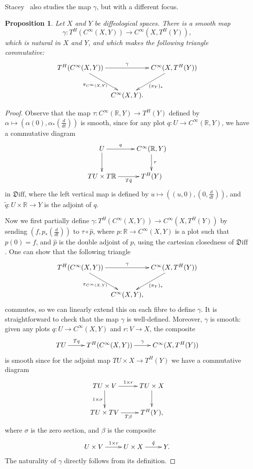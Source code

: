 \documentclass[12pt]{amsart}
\newtheorem{prop}[de]{Proposition}
\theoremstyle{remark}
\newcommand{\ra}{\to}
\newcommand{\lra}{\longrightarrow}
\newcommand{\Diff}{{\mathfrak{D}\mathrm{iff}}}
\def \R{\mathbb{R}}
\begin{document}
Stacey~\cite{St2} also studies the map $\gamma$, but with a different focus.

\begin{prop}\label{prop:map}
Let $X$ and $Y$ be diffeological spaces.
There is a smooth map
\[
\gamma:T^H(C^\infty(X,Y)) \lra C^\infty(X,T^H (Y)),
\]
which is natural in $X$ and $Y$,
and which makes the following triangle commutative:
\[
\xymatrix@C5pt{T^H(C^\infty(X,Y)) \ar[rr]^\gamma \ar[dr]_{\pi_{C^\infty(X,Y)}}
& & C^\infty(X,T^H(Y)) \ar[dl]^{(\pi_Y)_*} \\ & C^\infty(X,Y).}
\]
\end{prop}
\begin{proof}
Observe that the map $\tau:C^\infty(\R,Y) \ra T^H(Y)$ defined by
$\alpha \mapsto (\alpha(0),\alpha_* (\frac{d}{dt}))$ is smooth,
since for any plot $q:U \ra C^\infty(\R,Y)$,
we have a commutative diagram
\[
\xymatrix{U \ar[d] \ar[r]^-q & C^\infty(\R,Y) \ar[d]^-\tau \\
          TU \times T \R \ar[r]_-{T \tilde{q}} & T^H(Y)}
\]
in $\Diff$,
where the left vertical map is defined by $u \mapsto ((u,0),(0,\frac{d}{dt}))$,
and $\tilde{q}:U \times \R \ra Y$ is the adjoint of $q$.

Now we first partially define $\gamma:T^H(C^\infty(X,Y)) \ra C^\infty(X,T^H (Y))$
by sending $(f,p_*(\frac{d}{dt}))$ to $\tau \circ \hat{p}$,
where $p:\R \ra C^\infty(X,Y)$ is a plot such that $p(0)=f$,
and $\hat{p}$ is the double adjoint of $p$,
using the cartesian closedness of $\Diff$.
One can show that the following triangle
\[
\xymatrix@C5pt{T^H(C^\infty(X,Y)) \ar[rr]^\gamma \ar[dr]_{\pi_{C^\infty(X,Y)}} & & C^\infty(X,T^H(Y)) \ar[dl]^{(\pi_Y)_*} \\ & C^\infty(X,Y),}
\]
commutes, so we can linearly extend this on each fibre to define $\gamma$.
It is straightforward to check that the map $\gamma$ is well-defined.
Moreover, $\gamma$ is smooth:
given any plots $q:U \ra C^\infty(X,Y)$ and $r:V \ra X$, the composite
\[
\xymatrix{TU \ar[r]^-{Tq} & T^H(C^\infty(X,Y)) \ar[r]^\gamma & C^\infty(X,T^H(Y))}
\]
is smooth since for the adjoint map $TU \times X \ra T^H(Y)$
we have a commutative diagram
\[
\xymatrix{TU \times V \ar[r]^{1 \times r} \ar[d]_{1 \times \sigma} & TU \times X \ar[d] \\ TU \times TV \ar[r]_{T \beta} & T^H(Y),}
\]
where $\sigma$ is the zero section, and $\beta$ is the composite
\[
\xymatrix{U \times V \ar[r]^{1 \times r} & U \times X \ar[r]^-{\tilde{q}} & Y.}
\]
The naturality of $\gamma$ directly follows from its definition.
\end{proof}
\end{document}
